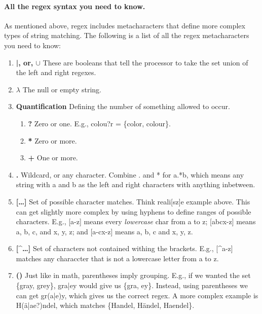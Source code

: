 \documentclass[10pt]{article}
\begin{document}
\paragraph{All the regex syntax you need to know.}
As mentioned above, regex includes metacharacters that define more complex types
of string matching.
The following is a list of all the regex metacharacters you need to know:
\begin{enumerate}
\item \textbf{|, or, $\cup$}
These are booleans that tell the processor to take the set union of the left
and right regexes.
\item \textbf{$\lambda$}
The null or empty string.
\item \textbf{Quantification}
Defining the number of something allowed to occur.
    \begin{enumerate}
    \item \textbf{?}
    Zero or one.
    E.g., colou?r = \{color, colour\}.
    \item \textbf{*}
    Zero or more.
    \item \textbf{+}
    One or more.
    \end{enumerate}
\item \textbf{.}
Wildcard, or any character.
Combine . and * for a.*b, which means any string with a and b as the left and right
characters with anything inbetween.
\item \textbf{[\ldots]}
Set of possible character matches.
Think reali[sz]e example above.
This can get slightly more complex by using hyphens to define ranges of possible characters.
E.g., [a-z] means every \textit{lowercase} char from a to z;
[abcx-z] means a, b, c, and x, y, z; and [a-cx-z] means a, b, c and x, y, z.
\item \textbf{[\string^\ldots]}
Set of characters not contained withing the brackets.
E.g., [\string^a-z] matches any characcter that is not a lowercase letter from a to z.
\item \textbf{()}
Just like in math, parentheses imply grouping.
E.g., if we wanted the set \{gray, grey\}, gra|ey would give us \{gra, ey\}.
Instead, using parentheses we can get gr(a|e)y, which gives us the correct regex.
A more complex example is H(\"{a}|ae?)ndel, which matches \{Handel, H\"{a}ndel, Haendel\}.
\end{enumerate}
\end{document}
